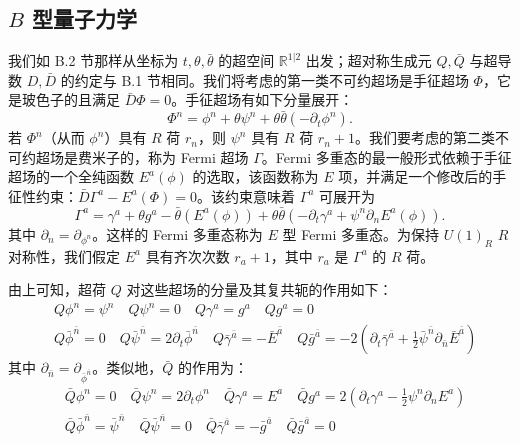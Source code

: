 \subsection{$B$ 型量子力学}
我们如 B.2 节那样从坐标为 $t,\theta,\bar\theta$ 的超空间 $\mathbb{R}^{1|2}$ 出发；超对称生成元 $Q,\bar Q$ 与超导数 $D,\bar D$ 的约定与 B.1 节相同。我们将考虑的第一类不可约超场是手征超场 $\Phi$，它是玻色子的且满足 $\bar D\Phi=0$。手征超场有如下分量展开：
\begin{equation}\tag{C.1}
  \Phi^n=\phi^n+\theta\psi^n+\theta\bar\theta(-\partial_t\phi^n).
\end{equation}
若 $\Phi^n$（从而 $\phi^n$）具有 $R$ 荷 $r_n$，则 $\psi^n$ 具有 $R$ 荷 $r_n+1$。我们要考虑的第二类不可约超场是费米子的，称为 Fermi 超场 $\Gamma$。Fermi 多重态的最一般形式依赖于手征超场的一个全纯函数 $E^a(\phi)$ 的选取，该函数称为 $E$ 项，并满足一个修改后的手征性约束：$\bar D\Gamma^a-E^a(\Phi)=0$。该约束意味着 $\Gamma^a$ 可展开为
\begin{equation}\tag{C.2}
  \Gamma^a=\gamma^a+\theta g^a-\bar\theta(E^a(\phi))+\theta\bar\theta(-\partial_t\gamma^a+\psi^n\partial_nE^a(\phi)).
\end{equation}
其中 $\partial_n=\partial_{\phi^n}$。这样的 Fermi 多重态称为 $E$ 型 Fermi 多重态。为保持 $U(1)_R$ $R$ 对称性，我们假定 $E^a$ 具有齐次次数 $r_a+1$，其中 $r_a$ 是 $\Gamma^a$ 的 $R$ 荷。

由上可知，超荷 $Q$ 对这些超场的分量及其复共轭的作用如下：
\begin{equation}\tag{C.3}
  \begin{aligned}
  &Q\phi^n=\psi^n\quad Q\psi^n=0\quad Q\gamma^a=g^a\quad Qg^a=0\\
  &Q\bar\phi^{\bar n}=0\quad Q\bar\psi^{\bar n}=2\partial_t\bar\phi^{\bar n}\quad Q\bar\gamma^{\bar a}=-\bar E^{\bar a}\quad Q\bar g^{\bar a}=-2(\partial_t\bar\gamma^{\bar a}+\tfrac{1}{2}\bar\psi^{\bar n}\partial_{\bar n}\bar E^{\bar a})
  \end{aligned}
\end{equation}
其中 $\partial_{\bar n}=\partial_{\bar\phi^{\bar n}}$。类似地，$\bar Q$ 的作用为：
\begin{equation}\tag{C.4}
  \begin{aligned}
  &\bar Q\phi^n=0\quad \bar Q\psi^n=2\partial_t\phi^n\quad \bar Q\gamma^a=E^a\quad \bar Qg^a=2(\partial_t\gamma^a-\tfrac{1}{2}\psi^n\partial_nE^a)\\
  &\bar Q\bar\phi^{\bar n}=\bar\psi^{\bar n}\quad \bar Q\bar\psi^{\bar n}=0\quad \bar Q\bar\gamma^{\bar a}=-\bar g^{\bar a}\quad \bar Q\bar g^{\bar a}=0
  \end{aligned}
\end{equation}

